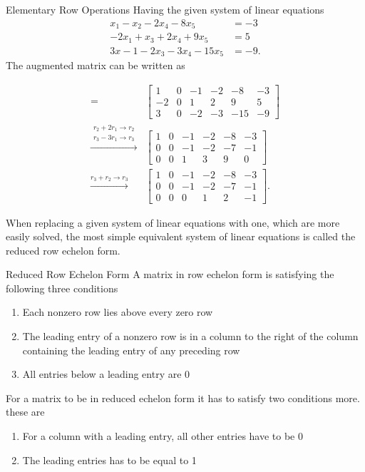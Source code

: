 \begin{example}{Elementary Row Operations}
 Having the given system of linear equations
\begin{align*}
    x_1-x_2-2x_4-8x_5&=-3\\
    -2x_1+x_3+2x_4+9x_5 &= 5\\
    3x-1-2x_3-3x_4-15x_5&=-9.
\end{align*}
The augmented matrix can be written as

\begin{align*}
[A \textbf{b}] =
	&\begin{bmatrix}
	1 & 0 & -1 &-2 & -8 & -3 \\
	-2 & 0 & 1 & 2 & 9 & 5 \\
	3 &0 & -2 & -3 & -15 & -9 
   \end{bmatrix} \\
  \xrightarrow{\substack{r_2+2r_1\rightarrow r_2\\  r_3-3r_1\rightarrow r_3}}
  &\begin{bmatrix}
 	 1 & 0 & -1 &-2 & -8 & -3 \\
 	 0 & 0 & -1 & -2 & -7 & -1 \\
	 0 &0 & 1 & 3 & 9 & 0
  \end{bmatrix}\\
  \xrightarrow{r_3+r_2\rightarrow r_3}
    &\begin{bmatrix}
  	 1 & 0 & -1 &-2 & -8 & -3 \\
 	 0 & 0 & -1 & -2 & -7 & -1 \\
	 0 &0 & 0 & 1 & 2 & -1
       \end{bmatrix}.
\end{align*}
\label{exa:rowoperations}
\end{example}
When replacing a given system of linear equations with one, which are more easily solved, the most simple equivalent system of linear equations is called the reduced row echelon form. 
\begin{definition}{Reduced Row Echelon Form}
A matrix in row echelon form is satisfying the following three conditions
\begin{enumerate}
    \item Each nonzero row lies above every zero row
    \item The leading entry of a nonzero row is in a column to the right of the column containing the leading entry of any preceding row
    \item All entries below a leading entry are $0$
\end{enumerate}
For a matrix to be in reduced echelon form it has to satisfy two conditions more. these are
\begin{enumerate}
    \item For a column with a leading entry, all other entries have to be 0
    \item The leading entries has to be equal to 1
\end{enumerate}
\cite[33]{LiAl}
\end{definition}
